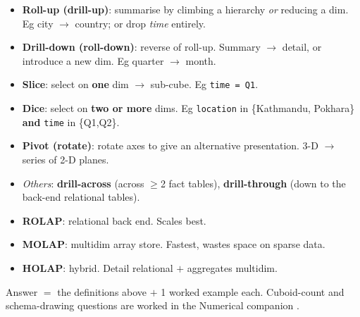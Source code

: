 \vspace{2pt}
\begin{itemize}
  \item \textbf{Roll-up (drill-up)}: summarise by climbing a hierarchy \emph{or} reducing a dim.
        Eg city $\rightarrow$ country; or drop \emph{time} entirely.
  \item \textbf{Drill-down (roll-down)}: reverse of roll-up. Summary $\rightarrow$ detail,
        or introduce a new dim. Eg quarter $\rightarrow$ month.
  \item \textbf{Slice}: select on \textbf{one} dim $\rightarrow$ sub-cube. Eg \texttt{time = Q1}.
  \item \textbf{Dice}: select on \textbf{two or more} dims. Eg
        \texttt{location} in \{Kathmandu, Pokhara\} \textbf{and} \texttt{time} in \{Q1,Q2\}.
  \item \textbf{Pivot (rotate)}: rotate axes to give an alternative presentation. 3-D $\rightarrow$ series of 2-D planes.
  \item \emph{Others}: \textbf{drill-across} (across $\ge$2 fact tables), \textbf{drill-through}
        (down to the back-end relational tables).
\end{itemize}

\vspace{2pt}
\Needspace*{7.5cm}

\vspace{2pt}
\begin{itemize}
  \item \textbf{ROLAP}: relational back end. Scales best.
  \item \textbf{MOLAP}: multidim array store. Fastest, wastes space on sparse data.
  \item \textbf{HOLAP}: hybrid. Detail relational $+$ aggregates multidim.
\end{itemize}

{\color{sub}\footnotesize {} \gap Answer $=$ the definitions above $+$ 1 worked example each.
Cuboid-count and schema-drawing questions are worked in the Numerical companion .}

\hr


